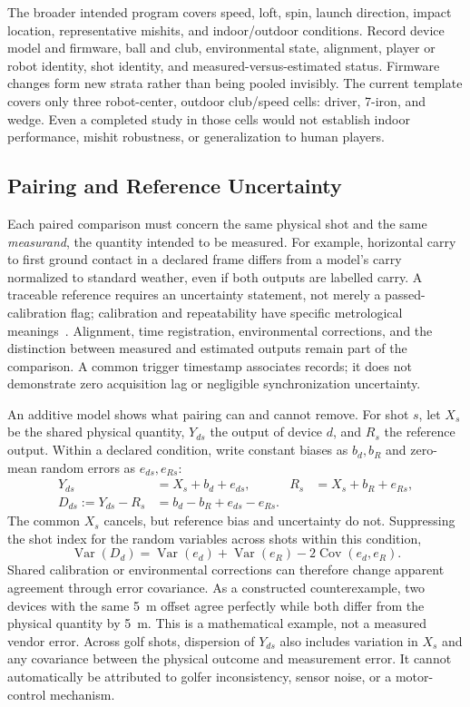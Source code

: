 The broader intended program covers speed, loft, spin, launch direction, impact location, representative mishits, and indoor/outdoor conditions.
Record device model and firmware, ball and club, environmental state, alignment, player or robot identity, shot identity, and measured-versus-estimated status.
Firmware changes form new strata rather than being pooled invisibly.
The current template covers only three robot-center, outdoor club/speed cells: driver, 7-iron, and wedge.
Even a completed study in those cells would not establish indoor performance, mishit robustness, or generalization to human players.

\subsection{Pairing and Reference Uncertainty}

Each paired comparison must concern the same physical shot and the same \emph{measurand}, the quantity intended to be measured.
For example, horizontal carry to first ground contact in a declared frame differs from a model's carry normalized to standard weather, even if both outputs are labelled carry.
A traceable reference requires an uncertainty statement, not merely a passed-calibration flag; calibration and repeatability have specific metrological meanings~\cite{jcgmvim}.
Alignment, time registration, environmental corrections, and the distinction between measured and estimated outputs remain part of the comparison.
A common trigger timestamp associates records; it does not demonstrate zero acquisition lag or negligible synchronization uncertainty.

An additive model shows what pairing can and cannot remove.
For shot $s$, let $X_s$ be the shared physical quantity, $Y_{ds}$ the output of device $d$, and $R_s$ the reference output.
Within a declared condition, write constant biases as $b_d,b_R$ and zero-mean random errors as $e_{ds},e_{Rs}$:
\begin{align}
Y_{ds}&=X_s+b_d+e_{ds}, & R_s&=X_s+b_R+e_{Rs},\\
D_{ds}:=Y_{ds}-R_s&=b_d-b_R+e_{ds}-e_{Rs}.
\label{eq:paired-device-difference}
\end{align}
The common $X_s$ cancels, but reference bias and uncertainty do not.
Suppressing the shot index for the random variables across shots within this condition,
\begin{equation}
\operatorname{Var}(D_d)=\operatorname{Var}(e_d)+\operatorname{Var}(e_R)
-2\operatorname{Cov}(e_d,e_R).
\label{eq:paired-error-variance}
\end{equation}
Shared calibration or environmental corrections can therefore change apparent agreement through error covariance.
As a constructed counterexample, two devices with the same \SI{5}{\meter} offset agree perfectly while both differ from the physical quantity by \SI{5}{\meter}.
This is a mathematical example, not a measured vendor error.
Across golf shots, dispersion of $Y_{ds}$ also includes variation in $X_s$ and any covariance between the physical outcome and measurement error.
It cannot automatically be attributed to golfer inconsistency, sensor noise, or a motor-control mechanism.

